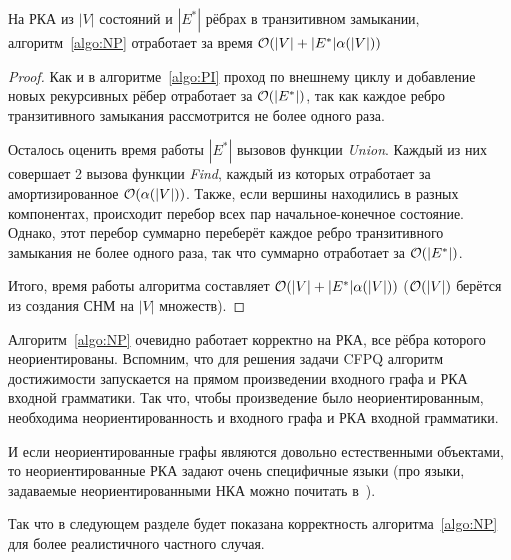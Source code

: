 \begin{theorem}
  На РКА из $|V|$ состояний и $|E^{*}|$ рёбрах в транзитивном замыкании, алгоритм~\ref{algo:NP} отработает за время $\mathcal{O}(|V| + |E^{*}| \alpha(|V|))$
\end{theorem}

\begin{proof}
  Как и в алгоритме~\ref{algo:PI} проход по внешнему циклу и добавление новых рекурсивных рёбер отработает за $\mathcal{O}(|E^{*}|)$, так как каждое ребро транзитивного замыкания рассмотрится не более одного раза.

  Осталось оценить время работы $|E^{*}|$ вызовов функции \textit{Union}. Каждый из них совершает 2 вызова функции \textit{Find}, каждый из которых отработает за амортизированное $\mathcal{O}(\alpha(|V|))$. Также, если вершины находились в разных компонентах, происходит перебор всех пар начальное-конечное состояние. Однако, этот перебор суммарно переберёт каждое ребро транзитивного замыкания не более одного раза, так что суммарно отработает за $\mathcal{O}(|E^{*}|)$.

  Итого, время работы алгоритма составляет $\mathcal{O}(|V| + |E^{*}| \alpha(|V|))$ ($\mathcal{O}(|V|)$ берётся из создания СНМ на $|V|$ множеств). 
\end{proof}



\begin{note}
  Алгоритм~\ref{algo:NP} очевидно работает корректно на РКА, все рёбра которого неориентированы. Вспомним, что для решения задачи CFPQ алгоритм достижимости запускается на прямом произведении входного графа и РКА входной грамматики. Так что, чтобы произведение было неориентированным, необходима неориентированность и входного графа и РКА входной грамматики. 

  И если неориентированные графы являются довольно естественными объектами, то неориентированные РКА задают очень специфичные языки (про языки, задаваемые неориентированными НКА можно почитать в~\cite{Kutrib18}). 

  Так что в следующем разделе будет показана корректность алгоритма~\ref{algo:NP} для более реалистичного частного случая.
\end{note}

